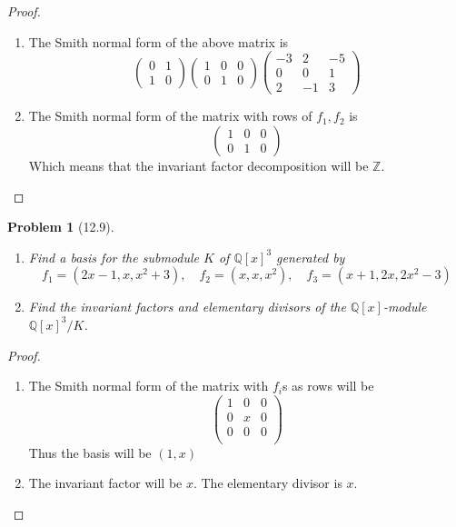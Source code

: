 \documentclass[10pt]{article}
\newcommand{\sk}{\vskip 10mm}
\newcommand{\bb}[1]{\mathbb{#1}}
\theoremstyle{plain}
\newtheorem{problem}{Problem}
\theoremstyle{remark}
\begin{document}
\begin{proof}
  \begin{enumerate}
  \item The Smith normal form of the above matrix is
    \[
      \left(
        \begin{array}{rr}
          0 & 1 \\
          1 & 0
        \end{array}
      \right)
      \left(
        \begin{array}{rrr}
          1 & 0 & 0 \\
          0 & 1 & 0
        \end{array}
      \right)
      \left(
        \begin{array}{rrr}
          -3 & 2 & -5 \\
          0 & 0 & 1 \\
          2 & -1 & 3
        \end{array}
      \right)
    \]
  \item The Smith normal form of the matrix with rows of $f_1,f_2$
    is
    \[
      \left(
        \begin{array}{ccc}
          1&0&0\\
          0&1&0
        \end{array}
      \right)
    \]
    Which means that the invariant factor decomposition will be
    $\bb{Z}$.
  \end{enumerate}
\end{proof}

\sk

\begin{problem}[12.9]
  \begin{enumerate}
  \item Find a basis for the submodule $K$ of $\bb{Q}[x]^3$ generated by
    \[ f_1=(2x-1,x,x^2+3),\quad f_2=(x,x,x^2),\quad f_3=(x+1,2x,2x^2-3)\]
  \item Find the invariant factors and elementary divisors of the
    $\bb{Q}[x]$-module $\bb{Q}[x]^3/K$.
  \end{enumerate}
\end{problem}

\begin{proof}
  \begin{enumerate}
  \item The Smith normal form of the matrix with $f_i$s as rows will be
    \[
      \left(
      \begin{array}{ccc}
        1 & 0 & 0 \\
        0 & x & 0 \\
        0 & 0 & 0\\
      \end{array}
      \right)
    \]
    Thus the basis will be $(1,x)$
  \item The invariant factor will be $x$. The elementary divisor is $x$.
\end{enumerate}
\end{proof}
\end{document}
